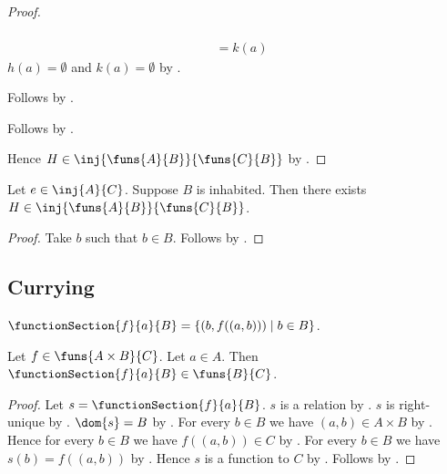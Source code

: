 \begin{proof}
\begin{subproof}
\begin{subproof}
\begin{subproof}
\begin{byCase}
\begin{align*}
                                \\
                                &= k(a)
                        \end{align*}
                        $h(a)=\emptyset$ and $k(a)=\emptyset$
                            by .
                \end{byCase}
            \end{subproof}
            Follows by .
        \end{subproof}
        Follows by .
    \end{subproof}
    Hence $H\in\inj{\funs{A}{B}}{\funs{C}{B}}$
        by .
\end{proof}

\begin{corollary}\label{function_space_domain_injection}
    Let $e\in\inj{A}{C}$.
    Suppose $B$ is inhabited.
    Then there exists $H\in\inj{\funs{A}{B}}{\funs{C}{B}}$.
\end{corollary}
\begin{proof}
    Take $b$ such that $b\in B$.
    Follows by .
\end{proof}


\subsection{Currying}

\begin{definition}\label{function_section}
    $\functionSection{f}{a}{B}
        =\{(b,f((a,b)))\mid b\in B\}$.
\end{definition}

\begin{proposition}\label{function_section_type}
    Let $f\in\funs{A\times B}{C}$.
    Let $a\in A$.
    Then $\functionSection{f}{a}{B}\in\funs{B}{C}$.
\end{proposition}
\begin{proof}
    Let $s=\functionSection{f}{a}{B}$.
    $s$ is a relation by .
    $s$ is right-unique
        by .
    $\dom{s}=B$ by .
    For every $b\in B$ we have $(a,b)\in A\times B$
        by .
    Hence for every $b\in B$ we have $f((a,b))\in C$
        by .
    For every $b\in B$ we have $s(b)=f((a,b))$
        by .
    Hence $s$ is a function to $C$ by \auto.
    Follows by .
\end{proof}

